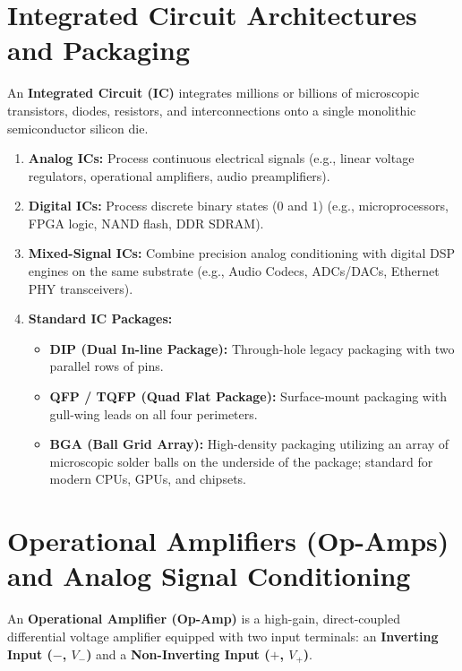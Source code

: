 \section{Integrated Circuit Architectures and Packaging}
\label{sec:integrated_circuits}

An \textbf{Integrated Circuit (IC)} integrates millions or billions of microscopic transistors, diodes, resistors, and interconnections onto a single monolithic semiconductor silicon die.

\begin{enumerate}[label=\bfseries\arabic*.]
    \item \textbf{Analog ICs:} Process continuous electrical signals (e.g., linear voltage regulators, operational amplifiers, audio preamplifiers).
    \item \textbf{Digital ICs:} Process discrete binary states ($0$ and $1$) (e.g., microprocessors, FPGA logic, NAND flash, DDR SDRAM).
    \item \textbf{Mixed-Signal ICs:} Combine precision analog conditioning with digital DSP engines on the same substrate (e.g., Audio Codecs, ADCs/DACs, Ethernet PHY transceivers).
    \item \textbf{Standard IC Packages:}
    \begin{itemize}
        \item \textbf{DIP (Dual In-line Package):} Through-hole legacy packaging with two parallel rows of pins.
        \item \textbf{QFP / TQFP (Quad Flat Package):} Surface-mount packaging with gull-wing leads on all four perimeters.
        \item \textbf{BGA (Ball Grid Array):} High-density packaging utilizing an array of microscopic solder balls on the underside of the package; standard for modern CPUs, GPUs, and chipsets.
    \end{itemize}
\end{enumerate}


\section{Operational Amplifiers (Op-Amps) and Analog Signal Conditioning}
\label{sec:op_amps}

An \textbf{Operational Amplifier (Op-Amp)} is a high-gain, direct-coupled differential voltage amplifier equipped with two input terminals: an \textbf{Inverting Input ($-$, $V_-$)} and a \textbf{Non-Inverting Input ($+$, $V_+$)}.

